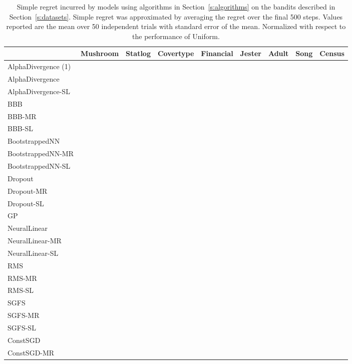 \documentclass{article} \usepackage{iclr2018_conference,times}
\begin{document}
\begin{landscape}
\begin{table}[ht]
  \caption{Simple regret incurred by models using algorithms in Section~\ref{s:algorithms} on the bandits described in Section~\ref{s:datasets}. Simple regret was approximated by averaging the regret over the final 500 steps. Values reported are the mean over 50 independent trials with standard error of the mean. Normalized with respect to the performance of Uniform.}
  \label{tab:nonlinear_simple_regret_appendix}
  \centering
  \footnotesize
  \tiny
	\vspace*{\fill}
	\begin{adjustbox}{center}
	\begin{tabular}{lllllllll}
 & Mushroom & Statlog & Covertype & Financial & Jester & Adult & Song & Census \\
\midrule
AlphaDivergence (1) & & & & & & & &  \\
AlphaDivergence & & & & & & & &  \\
AlphaDivergence-SL & & & & & & & &  \\
BBB & \bm{}& & & & & & &  \\
BBB-MR & & & & & & & &  \\
BBB-SL & & & & & & & &  \\
BootstrappedNN & & & & & & & &  \\
BootstrappedNN-MR & & & & & & & &  \\
BootstrappedNN-SL & & \bm{}& & & & & &  \\
Dropout & & & & & & & &  \\
Dropout-MR & \bm{}& & & & & & &  \\
Dropout-SL & & & & & & & &  \\
GP & & & & \bm{}& & & &  \\
NeuralLinear & \bm{}& & & & & & &  \\
NeuralLinear-MR & & & & & & & &  \\
NeuralLinear-SL & & \bm{}& & & & & &  \\
RMS & & & & & & & &  \\
RMS-MR & & & & & & & &  \\
RMS-SL & & & & & & & &  \\
SGFS & & & & & & & &  \\
SGFS-MR & & & & & & & &  \\
SGFS-SL & & & & & & & &  \\
ConstSGD & & & \bm{}& & & & &  \\
ConstSGD-MR & & & & & & & &  \\

\end{tabular}
\end{adjustbox}
\end{table}
\end{landscape}
\end{document}
